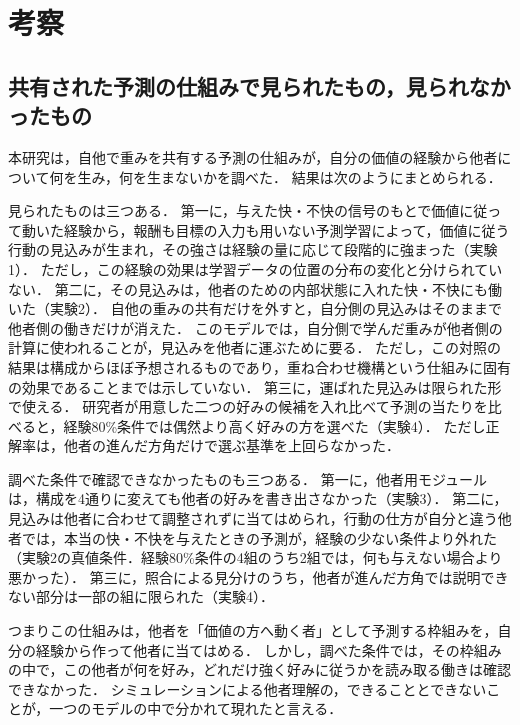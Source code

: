 \section{考察}\label{sec:discussion}

\subsection{共有された予測の仕組みで見られたもの，見られなかったもの}\label{sec:disc-summary}
本研究は，自他で重みを共有する予測の仕組みが，自分の価値の経験から他者について何を生み，何を生まないかを調べた．
結果は次のようにまとめられる．

見られたものは三つある．
第一に，与えた快・不快の信号のもとで価値に従って動いた経験から，報酬も目標の入力も用いない予測学習によって，価値に従う行動の見込みが生まれ，その強さは経験の量に応じて段階的に強まった（実験1）．
ただし，この経験の効果は学習データの位置の分布の変化と分けられていない．
第二に，その見込みは，他者のための内部状態に入れた快・不快にも働いた（実験2）．
自他の重みの共有だけを外すと，自分側の見込みはそのままで他者側の働きだけが消えた．
このモデルでは，自分側で学んだ重みが他者側の計算に使われることが，見込みを他者に運ぶために要る．
ただし，この対照の結果は構成からほぼ予想されるものであり，重ね合わせ機構という仕組みに固有の効果であることまでは示していない．
第三に，運ばれた見込みは限られた形で使える．
研究者が用意した二つの好みの候補を入れ比べて予測の当たりを比べると，経験80\%条件では偶然より高く好みの方を選べた（実験4）．
ただし正解率は，他者の進んだ方角だけで選ぶ基準を上回らなかった．

調べた条件で確認できなかったものも三つある．
第一に，他者用モジュールは，構成を4通りに変えても他者の好みを書き出さなかった（実験3）．
第二に，見込みは他者に合わせて調整されずに当てはめられ，行動の仕方が自分と違う他者では，本当の快・不快を与えたときの予測が，経験の少ない条件より外れた（実験2の真値条件．経験80\%条件の4組のうち2組では，何も与えない場合より悪かった）．
第三に，照合による見分けのうち，他者が進んだ方角では説明できない部分は一部の組に限られた（実験4）．

つまりこの仕組みは，他者を「価値の方へ動く者」として予測する枠組みを，自分の経験から作って他者に当てはめる．
しかし，調べた条件では，その枠組みの中で，この他者が何を好み，どれだけ強く好みに従うかを読み取る働きは確認できなかった．
シミュレーションによる他者理解の，できることとできないことが，一つのモデルの中で分かれて現れたと言える．

